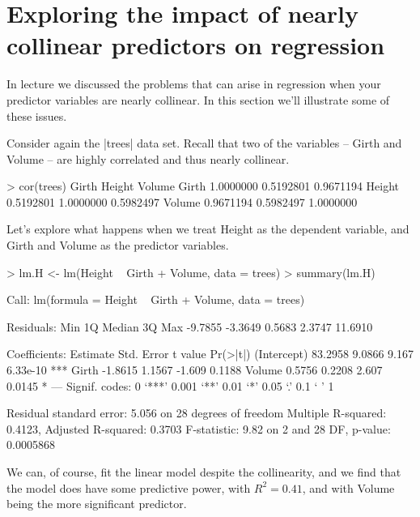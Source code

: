 \section{Exploring the impact of nearly collinear predictors on regression}

In lecture we discussed the problems that can arise in regression when your predictor variables are nearly collinear. In this section we'll illustrate some of these issues.

Consider again the |trees| data set.  Recall that two of the variables -- Girth and Volume -- are highly correlated and thus nearly collinear.
%
\begin{R}
> cor(trees)
           Girth    Height    Volume
Girth  1.0000000 0.5192801 0.9671194
Height 0.5192801 1.0000000 0.5982497
Volume 0.9671194 0.5982497 1.0000000
\end{R}
%
Let's explore what happens when we treat Height as the dependent variable, and Girth and Volume as the predictor variables.
%
\begin{R}
> lm.H <- lm(Height ~ Girth + Volume, data = trees)
> summary(lm.H)

Call:
lm(formula = Height ~ Girth + Volume, data = trees)

Residuals:
    Min      1Q  Median      3Q     Max 
-9.7855 -3.3649  0.5683  2.3747 11.6910 

Coefficients:
            Estimate Std. Error t value Pr(>|t|)    
(Intercept)  83.2958     9.0866   9.167 6.33e-10 ***
Girth        -1.8615     1.1567  -1.609   0.1188    
Volume        0.5756     0.2208   2.607   0.0145 *  
---
Signif. codes:  0 ‘***’ 0.001 ‘**’ 0.01 ‘*’ 0.05 ‘.’ 0.1 ‘ ’ 1

Residual standard error: 5.056 on 28 degrees of freedom
Multiple R-squared:  0.4123,    Adjusted R-squared:  0.3703 
F-statistic:  9.82 on 2 and 28 DF,  p-value: 0.0005868
\end{R}
%
We can, of course, fit the linear model despite the collinearity, and we find that the model does have some predictive power, with $R^2 = 0.41$, and with Volume being the more significant predictor.

